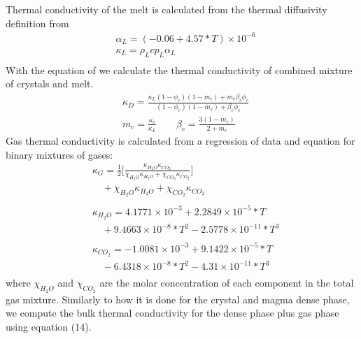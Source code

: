Thermal conductivity of the melt is calculated from the thermal diffusivity definition from \cite{moitra2018}
\begin{equation}
	\begin{split}
		&\alpha_L = (-0.06 + 4.57*T)\times 10^{-6}\\
		&\kappa_L = \rho_L cp_L \alpha_L\\
	\end{split}
\end{equation}
With the equation of \cite{heap2020} we calculate the thermal conductivity of combined mixture of crystals and melt.
\begin{equation}
	\begin{split}
		&\kappa_D = \frac{\kappa_L(1-\phi_c)(1-m_c) + m_c \beta_c \phi_c}{(1-\phi_c)(1-m_c) + \beta_c \phi_c}\\
		&m_c = \frac{\kappa_c}{\kappa_L} \qquad \beta_c = \frac{3(1-m_c)}{2+m_c}
	\end{split}
\end{equation}
Gas thermal conductivity is calculated from a regression of data and \cite{udoetok2013} equation for binary mixtures of gases:   
\begin{equation}
	\begin{split}
		&\kappa_G = \frac{1}{2}\bigg[\frac{\kappa_{H_2O}\kappa_{CO_2}}{\chi_{H_2O}\kappa_{H_2O} + \chi_{CO_2}\kappa_{CO_2}}\bigg] \\
		&\quad +\chi_{H_2O}\kappa_{H_2O} + \chi_{CO_2}\kappa_{CO_2}\\
		\\&\kappa_{H_2O} = 4.1771\times 10^{-3} + 2.2849\times 10^{-5}*T \\
		&\quad + 9.4663\times 10^{-8} * T^2 - 2.5778\times 10^{-11} * T^3\\
		\\&\kappa_{CO_2} = -1.0081\times 10^{-3} + 9.1422\times 10^{-5}*T \\
		&\quad - 6.4318\times 10^{-8} * T^2 - 4.31\times 10^{-11} * T^3\\
	\end{split}
\end{equation}
where $\chi_{H_2O}$ and $\chi_{CO_2}$ are the molar concentration of each component in the total gas mixture. Similarly to how it is done for the crystal and magma dense phase, we compute the bulk thermal conductivity for the dense phase plus gas phase using equation (14).


